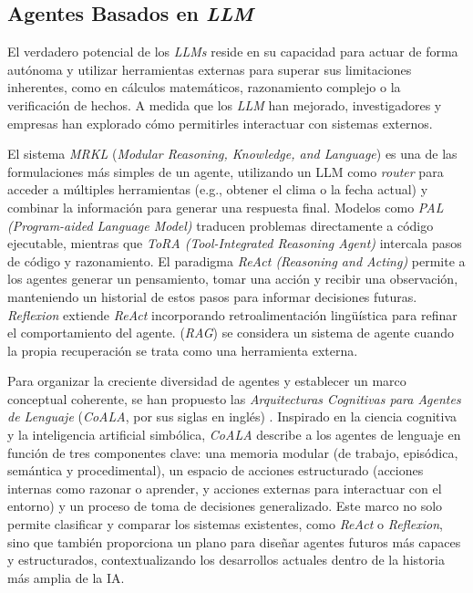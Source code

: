 \subsection{Agentes Basados en \textit{LLM}}
\label{subsec:agentes_llm}
El verdadero potencial de los \textit{LLMs} reside en su capacidad para actuar de forma autónoma y utilizar herramientas externas para superar sus limitaciones inherentes, como en cálculos matemáticos, razonamiento complejo o la verificación de hechos. A medida que los \textit{LLM} han mejorado, investigadores y empresas han explorado cómo permitirles interactuar con sistemas externos.

El sistema \textit{MRKL} (\textit{Modular Reasoning, Knowledge, and Language}) \parencite{karpasMRKLSystemsModular2022} es una de las formulaciones más simples de un agente, utilizando un LLM como \textit{router} para acceder a múltiples herramientas (e.g., obtener el clima o la fecha actual) y combinar la información para generar una respuesta final. Modelos como \textit{PAL (Program-aided Language Model)} \parencite{gaoPALProgramaidedLanguage2023} traducen problemas directamente a código ejecutable, mientras que \textit{ToRA (Tool-Integrated Reasoning Agent)} \parencite{gouToRAToolIntegratedReasoning2024} intercala pasos de código y razonamiento. El paradigma \textit{ReAct (Reasoning and Acting)} \parencite{yaoReActSynergizingReasoning2023} permite a los agentes generar un pensamiento, tomar una acción y recibir una observación, manteniendo un historial de estos pasos para informar decisiones futuras. \textit{Reflexion} \parencite{shinnReflexionLanguageAgents2023} extiende \textit{ReAct} incorporando retroalimentación lingüística para refinar el comportamiento del agente. (\textit{RAG}) se considera un sistema de agente cuando la propia recuperación se trata como una herramienta externa.

Para organizar la creciente diversidad de agentes y establecer un marco conceptual coherente, se han propuesto las \textit{Arquitecturas Cognitivas para Agentes de Lenguaje} (\textit{CoALA}, por sus siglas en inglés) \parencite{sumersCognitiveArchitecturesLanguage2024}. Inspirado en la ciencia cognitiva y la inteligencia artificial simbólica, \textit{CoALA} describe a los agentes de lenguaje en función de tres componentes clave: una memoria modular (de trabajo, episódica, semántica y procedimental), un espacio de acciones estructurado (acciones internas como razonar o aprender, y acciones externas para interactuar con el entorno) y un proceso de toma de decisiones generalizado. Este marco no solo permite clasificar y comparar los sistemas existentes, como \textit{ReAct} o \textit{Reflexion}, sino que también proporciona un plano para diseñar agentes futuros más capaces y estructurados, contextualizando los desarrollos actuales dentro de la historia más amplia de la IA.

